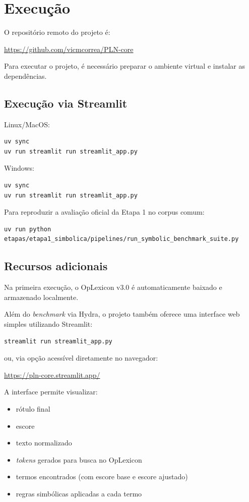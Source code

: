 \documentclass[11pt,a4paper]{article}
\begin{document}
\section{Execução}

O repositório remoto do projeto é:

\url{https://github.com/vicmcorrea/PLN-core}

Para executar o projeto, é necessário preparar o ambiente virtual e instalar as dependências.

\subsection*{Execução via Streamlit}

Linux/MacOS:
\begin{verbatim}
uv sync
uv run streamlit run streamlit_app.py
\end{verbatim}

Windows:
\begin{verbatim}
uv sync
uv run streamlit run streamlit_app.py
\end{verbatim}

Para reproduzir a avaliação oficial da Etapa 1 no corpus comum:

\begin{verbatim}
uv run python etapas/etapa1_simbolica/pipelines/run_symbolic_benchmark_suite.py
\end{verbatim}

\subsection*{Recursos adicionais}

Na primeira execução, o OpLexicon v3.0 é automaticamente baixado e armazenado localmente.

Além do \emph{benchmark} via Hydra, o projeto também oferece uma interface web simples utilizando Streamlit:

\begin{verbatim}
streamlit run streamlit_app.py
\end{verbatim}

ou, via opção acessível diretamente no navegador:

\url{https://pln-core.streamlit.app/}


A interface permite visualizar:
\begin{itemize}
  \item rótulo final
  \item escore
  \item texto normalizado
  \item \emph{tokens} gerados para busca no OpLexicon
  \item termos encontrados (com escore base e escore ajustado)
  \item regras simbólicas aplicadas a cada termo
\end{itemize}
\end{document}
